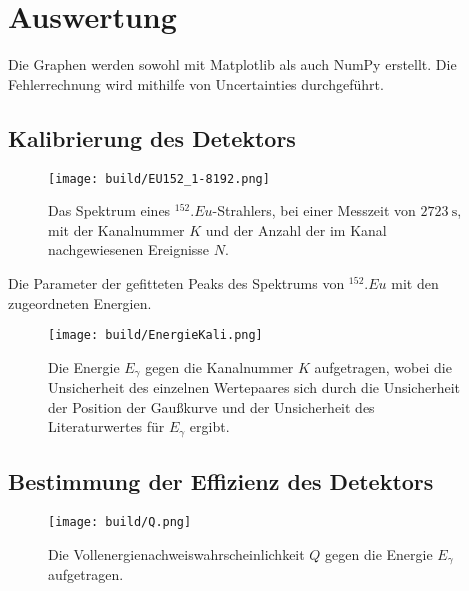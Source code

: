 \section{Auswertung}
\label{sec:Auswertung}

Die Graphen werden sowohl mit Matplotlib \cite{matplotlib} als auch NumPy \cite{numpy} erstellt. Die Fehlerrechnung wird mithilfe von Uncertainties \cite{uncertainties} durchgeführt.

\subsection{Kalibrierung des Detektors}

\begin{figure}
	\centering
	\texttt{[image: build/EU152\_1-8192.png]}
	\caption{Das Spektrum eines $^{152}.{Eu}$-Strahlers, bei einer Messzeit von $\SI{2723}{\second}$, mit der Kanalnummer $K$ und der Anzahl der im Kanal nachgewiesenen Ereignisse $N$.}
	\label{fig:SpektrumEu}
\end{figure}

\begin{table}
	\centering
	\caption{Die Parameter der gefitteten Peaks des Spektrums von $^{152}.{Eu}$ mit den zugeordneten Energien.}
	
	\label{tab:parameterEu}
\end{table}

\begin{figure}
	\centering
	\texttt{[image: build/EnergieKali.png]}
	\caption{Die Energie $E_\gamma$ gegen die Kanalnummer $K$ aufgetragen, wobei die Unsicherheit des einzelnen Wertepaares sich durch die Unsicherheit der Position der Gaußkurve und der Unsicherheit des Literaturwertes für $E_\gamma$ ergibt.}
	\label{fig:Kalibrierungi}
\end{figure}

\subsection{Bestimmung der Effizienz des Detektors}

\begin{figure}
	\centering
	\texttt{[image: build/Q.png]}
	\caption{Die Vollenergienachweiswahrscheinlichkeit $Q$ gegen die Energie $E_\gamma$ aufgetragen.}
	\label{fig:Q}
\end{figure}

